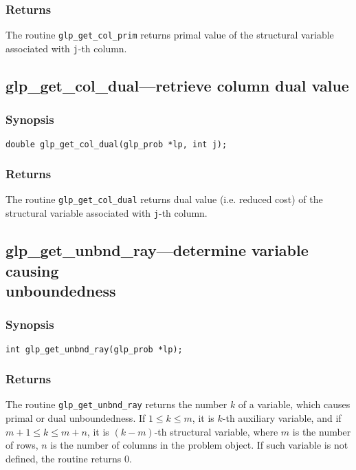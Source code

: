 \subsubsection*{Returns}

The routine \verb|glp_get_col_prim| returns primal value of the
structural variable associated with \verb|j|-th column.

\subsection{glp\_get\_col\_dual---retrieve column dual value}

\subsubsection*{Synopsis}

\begin{verbatim}
double glp_get_col_dual(glp_prob *lp, int j);
\end{verbatim}

\subsubsection*{Returns}

The routine \verb|glp_get_col_dual| returns dual value (i.e. reduced
cost) of the structural variable associated with \verb|j|-th column.

\subsection{glp\_get\_unbnd\_ray---determine variable causing\\
unboundedness}

\subsubsection*{Synopsis}

\begin{verbatim}
int glp_get_unbnd_ray(glp_prob *lp);
\end{verbatim}

\subsubsection*{Returns}

The routine \verb|glp_get_unbnd_ray| returns the number $k$ of
a variable, which causes primal or dual unboundedness.
If $1\leq k\leq m$, it is $k$-th auxiliary variable, and if
$m+1\leq k\leq m+n$, it is $(k-m)$-th structural variable, where $m$ is
the number of rows, $n$ is the number of columns in the problem object.
If such variable is not defined, the routine returns 0.

